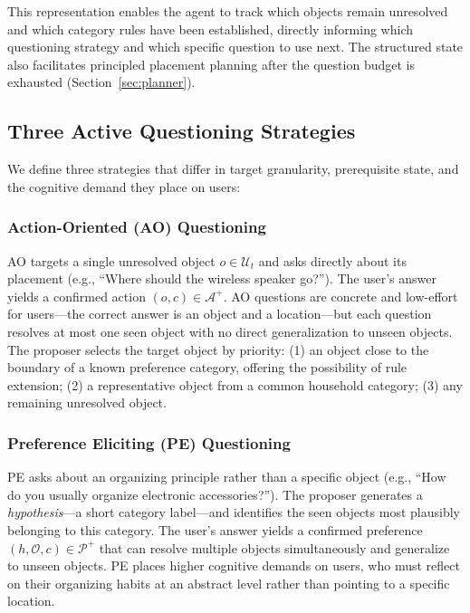 \documentclass[a4paper,fleqn]{cas-sc}
\begin{document}
This representation enables the agent to track which objects remain unresolved and which category rules have been established, directly informing which questioning strategy and which specific question to use next. The structured state also facilitates principled placement planning after the question budget is exhausted (Section~\ref{sec:planner}).

\subsection{Three Active Questioning Strategies}\label{sec:strategies}

We define three strategies that differ in target granularity, prerequisite state, and the cognitive demand they place on users:

\subsubsection{Action-Oriented (AO) Questioning}

AO targets a single unresolved object $o \in \mathcal{U}_t$ and asks directly about its placement (e.g., ``Where should the wireless speaker go?''). The user's answer yields a confirmed action $(o, c) \in \mathcal{A}^+$. AO questions are concrete and low-effort for users---the correct answer is an object and a location---but each question resolves at most one seen object with no direct generalization to unseen objects. The proposer selects the target object by priority: (1) an object close to the boundary of a known preference category, offering the possibility of rule extension; (2) a representative object from a common household category; (3) any remaining unresolved object.

\subsubsection{Preference Eliciting (PE) Questioning}

PE asks about an organizing principle rather than a specific object (e.g., ``How do you usually organize electronic accessories?''). The proposer generates a \emph{hypothesis}---a short category label---and identifies the seen objects most plausibly belonging to this category. The user's answer yields a confirmed preference $(h, \mathcal{O}, c) \in \mathcal{P}^+$ that can resolve multiple objects simultaneously and generalize to unseen objects. PE places higher cognitive demands on users, who must reflect on their organizing habits at an abstract level rather than pointing to a specific location.
\end{document}
